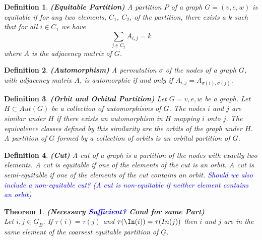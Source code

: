 \documentclass[10pt]{elsarticle}
\newtheorem{theorem}{Theorem}
\newtheorem{definition}{Definition}
\theoremstyle{remark}
\begin{document}
\begin{definition}\label{def:ep}{\textbf{(Equitable Partition)}}
A partition $P$ of a graph $G = (v,e,w)$ is equitable if for any two elements, $C_1$, $C_2$, of the partition, there exists a $k$ such that for all $i\in C_1$ we have
\[
\sum_{j \in C_2} A_{i,j} = k
\]
where $A$ is the adjacency matrix of $G$.
\end{definition}

\begin{definition}\label{def:auto}\textbf{(Automorphism)}
A permutation $\sigma$ of the nodes of a graph $G$, with adjacency matrix $A$, is automorphic if and only if $A_{i,j} = A_{\sigma(i),\sigma(j)}$.
\end{definition}

\begin{definition}\label{def:orbit}{\textbf{\emph{(Orbit and Orbital Partition)}}}
Let $G= {v,e,w}$ be a graph. Let $H \subset Aut(G)$ be a collection of automorphisms of $G$.
The nodes $i$ and $j$ are \emph{similar} under $H$ if there exists an automorphism in $H$ mapping $i$ onto $j$.
The equivalence classes defined by this similarity are the \emph{orbits} of the graph under $H$.
A partition of $G$ formed by a collection of orbits is an \emph{orbital partition} of $G$.
\end{definition}

\begin{definition}\label{def:cut}{\textbf{(Cut)}}
A \emph{cut} of a graph is a partition of the nodes with exactly two elements.
A cut is \emph{equitable} if one of the elements of the cut is an orbit.
A cut is \emph{semi-equitable} if one of the elements of the cut contains an orbit.
\textcolor{blue}{Should we also include a non-equitable cut? (A cut is \emph{non-equitable} if neither element contains an orbit)}
\end{definition}


\begin{theorem}{\textbf{(Necessary \textcolor{blue}{Sufficient?} Cond for same Part) \\}}
Let $i,j \in \underline{G}_B$. If $\tau(i) = \tau(j)$ and $\tau(\In(i)) = \tau(In(j))$ then $i$ and $j$ are in the same element of the
coarsest equitable partition of $\underline{G}$.
\end{theorem}
\end{document}
